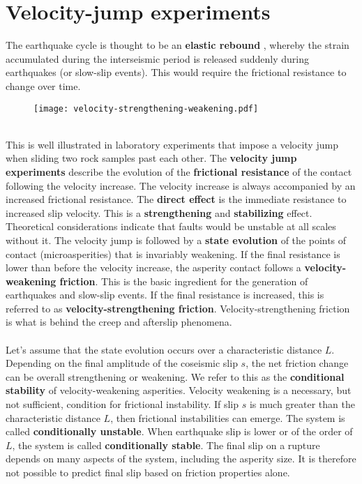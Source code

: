 \documentclass[letterpaper,12pt,]{memoir}
\begin{document}
\clearpage

\section{Velocity-jump experiments}

The earthquake cycle is thought to be an \textbf{elastic rebound} \citep{reid10}, whereby the strain accumulated during the interseismic period is released suddenly during earthquakes (or slow-slip events). This would require the frictional resistance to change over time. \\
%
\begin{figure}[h]
\begin{center}
\texttt{[image: velocity-strengthening-weakening.pdf]}
\end{center}
\end{figure}
\vspace{-0.5cm}
%
\\
This is well illustrated in laboratory experiments that impose a velocity jump when sliding two rock samples past each other. The \textbf{velocity jump experiments} describe the evolution of the \textbf{frictional resistance} of the contact following the velocity increase. The velocity increase is always accompanied by an increased frictional resistance. The \textbf{direct effect} is the immediate resistance to increased slip velocity. This is a \textbf{strengthening} and \textbf{stabilizing} effect. Theoretical considerations indicate that faults would be unstable at all scales without it. The velocity jump is followed by a \textbf{state evolution} of the points of contact (microasperities) that is invariably weakening. If the final resistance is lower than before the velocity increase, the asperity contact follows a \textbf{velocity-weakening friction}. This is the basic ingredient for the generation of earthquakes and slow-slip events. If the final resistance is increased, this is referred to as \textbf{velocity-strengthening friction}. Velocity-strengthening friction is what is behind the creep and afterslip phenomena. \\
%
\\
Let's assume that the state evolution occurs over a characteristic distance $L$. Depending on the final amplitude of the coseismic slip $s$, the net friction change can be overall strengthening or weakening. We refer to this as the \textbf{conditional stability} of velocity-weakening asperities. Velocity weakening is a necessary, but not sufficient, condition for frictional instability. If slip $s$ is much greater than the characteristic distance $L$, then frictional instabilities can emerge. The system is called \textbf{conditionally unstable}. When earthquake slip is lower or of the order of $L$, the system is called \textbf{conditionally stable}. The final slip on a rupture depends on many aspects of the system, including the asperity size. It is therefore not possible to predict final slip based on friction properties alone.
\end{document}
